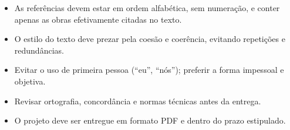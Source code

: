 \documentclass[
  brazilian,
  12pt,
  letterpaper,
  DIV=11,
  numbers=noendperiod]{scrartcl}
\begin{document}
\begin{itemize}
  As citações devem ser feitas corretamente: até 3 linhas entre aspas,
  acima de 3 linhas em recuo de 4 cm, fonte 10, sem aspas.
\item
  As referências devem estar em ordem alfabética, sem numeração, e
  conter apenas as obras efetivamente citadas no texto.
\item
  O estilo do texto deve prezar pela coesão e coerência, evitando
  repetições e redundâncias.
\item
  Evitar o uso de primeira pessoa (``eu'', ``nós''); preferir a forma
  impessoal e objetiva.
\item
  Revisar ortografia, concordância e normas técnicas antes da entrega.
\item
  O projeto deve ser entregue em formato PDF e dentro do prazo
  estipulado.
\end{itemize}
\end{document}
